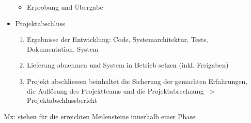\begin{itemize}
\begin{itemize}
		\item Erprobung und Übergabe
	\end{itemize}
	\item Projektabschluss \\
	\begin{enumerate}
		\item Ergebnisse der Entwicklung: Code, Systemarchitektur, Tests, Dokumentation, System
		\item Lieferung abnehmen und System in Betrieb setzen (inkl. Freigaben)
		\item Projekt abschliessen beinhaltet die Sicherung der gemachten Erfahrungen, die Auflösung des Projektteams und die Projektabrechnung --> Projektabschlussbericht
	\end{enumerate}
\end{itemize}
Mx: stehen für die erreichten Meilensteine innerhalb einer Phase


